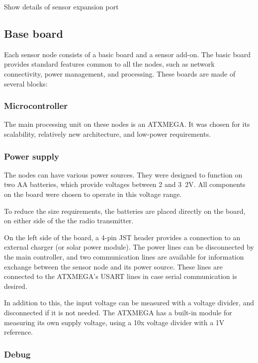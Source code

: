 Show details of sensor expansion port

\subsection{Base board}

Each sensor node consists of a basic board and a sensor add-on. The basic board
provides standard features common to all the nodes, such as network
connectivity, power management, and processing.
These boards are made of several blocks:

\subsubsection{Microcontroller}

The main processing unit on these nodes is an ATXMEGA. It was chosen for its
scalability, relatively new architecture, and low-power requirements.


\subsubsection{Power supply}
The nodes can have various power sources. They were designed to function on two
AA batteries, which provide voltages between 2 and \unit{3.2}{V}. All components on
the board were chosen to operate in this voltage range.

To reduce the size requirements, the batteries are placed directly on the board,
on either side of the the radio transmitter.

On the left side of the board, a 4-pin JST header provides a connection to an
external charger (or solar power module). The power lines can be disconnected by
the main controller, and two communication lines are available for information
exchange between the sensor node and its power source. These lines are connected
to the ATXMEGA's USART lines in case serial communication is desired.

In addition to this, the input voltage can be measured with a voltage divider,
and disconnected if it is not needed. The ATXMEGA has a built-in module for
measuring its own supply voltage, using a 10x voltage divider with a 1\unit{V}
reference.

\subsubsection{Debug}

